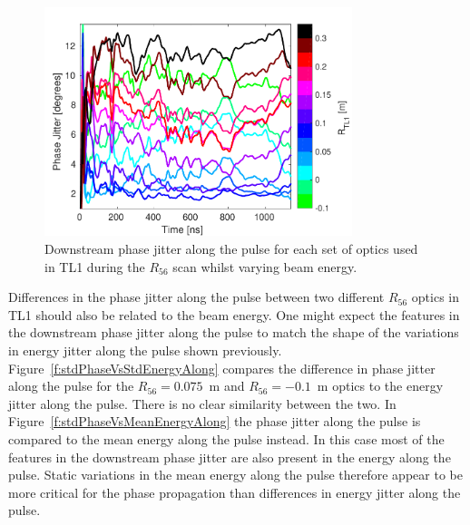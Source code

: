 \begin{figure}
  \centering
  \includegraphics[width=0.8\textwidth]{Figures/propagation/R56ScanGunWiggle_JitterAlong}
  \caption{Downstream phase jitter along the pulse for each set of optics used in TL1 during the \(R_{56}\) scan whilst varying beam energy.}
  \label{f:R56ScanGunWiggle_JitterAlong}
\end{figure}

Differences in the phase jitter along the pulse between two different \(R_{56}\) optics in TL1 should also be related to the beam energy. One might expect the features in the downstream phase jitter along the pulse to match the shape of the variations in energy jitter along the pulse shown previously. Figure~\ref{f:stdPhaseVsStdEnergyAlong} compares the difference in phase jitter along the pulse for the \(R_{56} = 0.075\)~m and \(R_{56} = -0.1\)~m optics to the energy jitter along the pulse. There is no clear similarity between the two. In Figure~\ref{f:stdPhaseVsMeanEnergyAlong} the phase jitter along the pulse is compared to the mean energy along the pulse instead. In this case most of the features in the downstream phase jitter are also present in the energy along the pulse. Static variations in the mean energy along the pulse therefore appear to be more critical for the phase propagation than differences in energy jitter along the pulse. %


